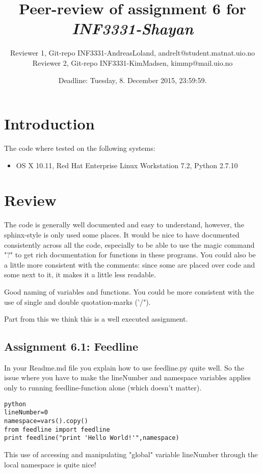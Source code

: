\documentclass[a4paper]{article}
\title{Peer-review of assignment 6 for \textit{INF3331-Shayan}}
\author{Reviewer 1, Git-repo INF3331-AndreasLoland, {andrelt@student.matnat.uio.no} \\
		Reviewer 2, Git-repo INF3331-KimMadsen, {kimmp@mail.uio.no}}
\date{Deadline: Tuesday, 8. December 2015, 23:59:59.}
\begin{document}
\maketitle

\section{Introduction}

The code where tested on the following systems:
\begin{itemize}
\item OS X 10.11, Red Hat Enterprise Linux Workstation 7.2, Python 2.7.10
\end{itemize}

\section{Review}\label{sec:general_review}

\begin{flushleft}
The code is generally well documented and easy to understand, however, the sphinx-style is only used some places. It would be nice to have documented consistently across all the code, especially to be able to use the magic command "?" to get rich documentation for functions in these programs. You could also be a little more consistent with the comments: since some are placed over code and some next to it, it makes it a little less readable. \newline

Good naming of variables and functions. You could be more consistent with the use of single and double quotation-marks ('/"). \newline

Part from this we think this is a well executed assignment.

\end{flushleft}

\subsection*{Assignment 6.1:  Feedline}
\begin{flushleft}
In your Readme.md file you explain how to use feedline.py quite well. So the issue where you have to make the lineNumber and namespace variables applies only to running feedline-function alone (which doesn't matter). \\
\begin{verbatim}
python
lineNumber=0
namespace=vars().copy()
from feedline import feedline
print feedline("print 'Hello World!'",namespace)
\end{verbatim}

This use of accessing and manipulating "global" variable lineNumber through the local namespace is quite nice!

\end{flushleft}
\end{document}

